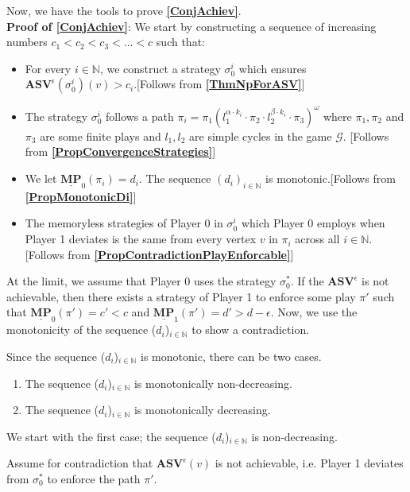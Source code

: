 Now, we have the tools to prove \textbf{\cref{ConjAchiev}}. \\
\noindent \textbf{Proof of \cref{ConjAchiev}}: We start by constructing a sequence of increasing numbers $c_1 < c_2 < c_3 < \dotsc < c$ such that:
\begin{itemize}
    \item For every $i \in \mathbb{N}$, we construct a strategy $\sigma_0^i$ which ensures $\mathbf{ASV}^{\epsilon}(\sigma_0^i)(v) > c_i$.[Follows from \textbf{\cref{ThmNpForASV}}]
    \item The strategy $\sigma_0^i$ follows a path $\pi_i = \pi_{1}(l^{\alpha \cdot k_i}_{1} \cdot \pi_{2} \cdot l^{\beta \cdot k_i}_{2} \cdot \pi_{3})^{\omega}$ where $\pi_1, \pi_2$ and $\pi_3$ are some finite plays and $l_1, l_2$ are simple cycles in the game $\mathcal{G}$. [Follows from \textbf{\cref{PropConvergenceStrategies}}]
    \item We let $\underline{\mathbf{MP}}_0(\pi_i) = d_i$. The sequence $(d_i)_{i\in \mathbb{N}}$ is monotonic.[Follows from \textbf{\cref{PropMonotonicDi}}]
    \item The memoryless strategies of Player 0 in $\sigma_0^i$ which Player 0 employs when Player 1 deviates is the same from every vertex $v$ in $\pi_i$ across all $i \in \mathbb{N}$.[Follows from \textbf{\cref{PropContradictionPlayEnforcable}}]
\end{itemize}

At the limit, we assume that Player 0 uses the strategy $\sigma_0^*$. If the $\mathbf{ASV}^{\epsilon}$ is not achievable, then there exists a strategy of Player 1 to enforce some play $\pi'$ such that $\underline{\mathbf{MP}}_0(\pi') = c' < c$ and $\underline{\mathbf{MP}}_1(\pi') = d' > d - \epsilon$. Now, we use the monotonicity of the sequence ($d_i$)$_{i \in \mathbb{N}}$ to show a contradiction. 

Since the sequence ($d_i$)$_{i \in \mathbb{N}}$ is monotonic, there can be two cases.
\begin{enumerate}
    \item The sequence ($d_i$)$_{i \in \mathbb{N}}$ is monotonically non-decreasing.
    \item The sequence ($d_i$)$_{i \in \mathbb{N}}$ is monotonically decreasing.
\end{enumerate}

We start with the first case; the sequence ($d_i$)$_{i \in \mathbb{N}}$ is non-decreasing.

Assume for contradiction that $\mathbf{ASV}^{\epsilon}(v)$ is not achievable, i.e. Player 1 deviates from $\sigma_0^*$ to enforce the path $\pi'$. 

